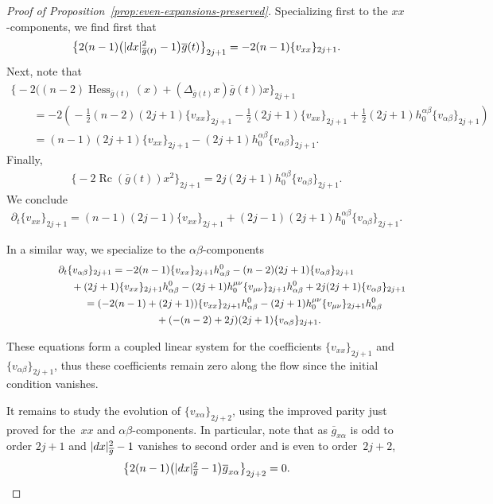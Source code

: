 \documentclass[11pt]{article}
\numberwithin{equation}{section}
\newcommand{\del}{\partial}
\newcommand{\olg}{\overline{g}}
\newcommand{\gbar}{\overline{g}}
\DeclareMathOperator{\Rc}{Rc}
\DeclareMathOperator{\hess}{Hess}
\begin{document}
\begin{proof}[Proof of Proposition~\ref{prop:even-expansions-preserved}]
Specializing first to the $xx$-components, we find first that
\[ \big\{ 2 (n-1) \big(|{\rm d}x|^2_{\gbar(t)} -1\big) \olg(t)\big\}_{2j+1} = -2(n-1) \{v_{xx}\}_{2j+1}. \]
Next, note that
\begin{gather*}
 \big\{ {-}2 \big( (n-2) \hess_{\olg(t)} (x) + (\Delta_{\olg(t)} x) \olg(t) \big) x\big\}_{2j+1} \\
\qquad{} = - 2\left(\!- \frac{1}{2} (n-2)(2j+1) \{ v_{xx} \}_{2j+1} - \frac{1}{2} (2j+1) \{ v_{xx} \}_{2j+1} + \frac{1}{2} (2j+1) h^{\alpha \beta}_0 \{v_{\alpha \beta}\}_{2j+1} \!\right) \\
 \qquad{} = (n-1) (2j+1) \{ v_{xx} \}_{2j+1} - (2j+1) h^{\alpha \beta}_0 \{v_{\alpha \beta}\}_{2j+1}.
\end{gather*}
Finally,
\begin{gather*}
\big\{ {-}2 \Rc(\gbar(t)) x^2 \big\}_{2j+1} = 2j( 2j+1) h^{\alpha \beta}_0 \{v_{\alpha \beta}\}_{2j+1}.
\end{gather*}
We conclude
\begin{gather*}
\del_t \{ v_{xx} \}_{2j+1} = (n-1)(2j-1) \{v_{xx}\}_{2j+1} + (2j-1)(2j+1) h^{\alpha \beta}_0 \{v_{\alpha \beta}\}_{2j+1}.
\end{gather*}

In a similar way, we specialize to the $\alpha \beta$-components
\begin{gather*}
 \del_t \{ v_{\alpha \beta} \}_{2j+1} = -2(n-1) \{v_{xx}\}_{2j+1} h^0_{\alpha \beta} - (n-2)(2j+1) \{ v_{\alpha \beta}\}_{2j+1} \nonumber \\
\hphantom{\del_t \{ v_{\alpha \beta} \}_{2j+1} =}{} + (2j+1) \{v_{xx}\}_{2j+1} h^0_{\alpha \beta} - (2j+1) h_0^{\mu \nu} \{v_{\mu\nu}\}_{2j+1} h^0_{\alpha \beta} + 2j(2j+1) \{v_{\alpha \beta}\}_{2j+1}\\
\hphantom{\del_t \{ v_{\alpha \beta} \}_{2j+1}}{} = (-2(n-1) + (2j+1)) \{v_{xx}\}_{2j+1} h^0_{\alpha \beta} - (2j+1) h_0^{\mu \nu} \{v_{\mu\nu}\}_{2j+1} h^0_{\alpha \beta}\\
\hphantom{\del_t \{ v_{\alpha \beta} \}_{2j+1} =}{} + ( -(n-2) + 2j )(2j+1) \{ v_{\alpha \beta}\}_{2j+1}.
\end{gather*}

These equations form a coupled linear system for the coefficients $\{v_{xx}\}_{2j+1}$ and $\{ v_{\alpha \beta} \}_{2j+1}$, thus these coefficients remain zero along the flow since the initial condition vanishes.

It remains to study the evolution of $\{v_{x \alpha}\}_{2j+2}$, using the improved parity just proved for the~$xx$ and $\alpha \beta$-components. In particular, note that as $\gbar_{x \alpha}$ is odd to order $2j+1$ and $|{\rm d}x|^2_{\gbar}-1$ vanishes to second order and is even to order~$2j+2$,
\[ \big\{ 2 (n-1) \big(|{\rm d}x|^2_{\gbar} -1\big) \olg_{x\alpha}\big\}_{2j+2} = 0. \]


\end{proof}
\end{document}
